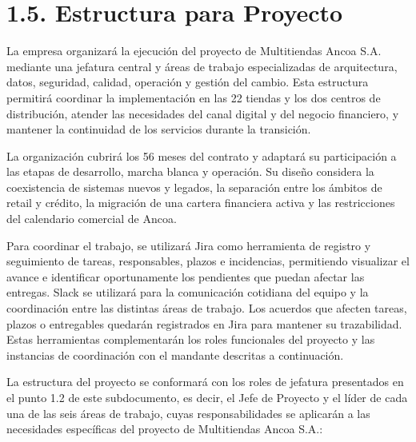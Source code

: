 \documentclass[11pt]{article}
\begin{document}
\section{1.5. Estructura para Proyecto}\label{estructura-para-proyecto}

La empresa organizará la ejecución del proyecto de Multitiendas Ancoa S.A. mediante una jefatura central y áreas de trabajo especializadas de arquitectura, datos, seguridad, calidad, operación y gestión del cambio. Esta estructura permitirá coordinar la implementación en las 22 tiendas y los dos centros de distribución, atender las necesidades del canal digital y del negocio financiero, y mantener la continuidad de los servicios durante la transición.

La organización cubrirá los 56 meses del contrato y adaptará su participación a las etapas de desarrollo, marcha blanca y operación. Su diseño considera la coexistencia de sistemas nuevos y legados, la separación entre los ámbitos de retail y crédito, la migración de una cartera financiera activa y las restricciones del calendario comercial de Ancoa.

Para coordinar el trabajo, se utilizará Jira como herramienta de registro y seguimiento de tareas, responsables, plazos e incidencias, permitiendo visualizar el avance e identificar oportunamente los pendientes que puedan afectar las entregas. Slack se utilizará para la comunicación cotidiana del equipo y la coordinación entre las distintas áreas de trabajo. Los acuerdos que afecten tareas, plazos o entregables quedarán registrados en Jira para mantener su trazabilidad. Estas herramientas complementarán los roles funcionales del proyecto y las instancias de coordinación con el mandante descritas a continuación.

La estructura del proyecto se conformará con los roles de jefatura presentados en el punto 1.2 de este subdocumento, es decir, el Jefe de Proyecto y el líder de cada una de las seis áreas de trabajo, cuyas responsabilidades se aplicarán a las necesidades específicas del proyecto de Multitiendas Ancoa S.A.:
\end{document}
